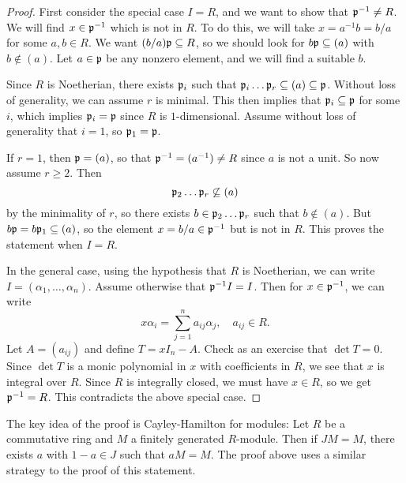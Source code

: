 \begin{proof}
  First consider the special case $I = R$, and we
  want to show that $\mathfrak{p}^{-1} \ne R$. We will find
  $x \in \mathfrak{p}^{-1}$ which is not in $R$. To do this,
  we will take $x = a^{-1} b = b / a$ for some $a, b \in R$.
  We want $(b / a) \mathfrak{p} \subseteq R$, so we should look
  for $b \mathfrak{p} \subseteq (a)$ with $b \notin (a)$.
  Let $a \in \mathfrak{p}$ be any nonzero element, and
  we will find a suitable $b$.

  Since $R$ is Noetherian, there exists $\mathfrak{p}_i$ such that
  $\mathfrak{p}_i \dots \mathfrak{p}_r \subseteq (a) \subseteq \mathfrak{p}$.
  Without loss of generality, we can assume $r$ is minimal.
  This then implies that $\mathfrak{p}_i \subseteq \mathfrak{p}$ for
  some $i$, which implies $\mathfrak{p}_i = \mathfrak{p}$ since
  $R$ is $1$-dimensional. Assume without loss of
  generality that $i = 1$, so $\mathfrak{p}_1 = \mathfrak{p}$.

  If $r = 1$, then $\mathfrak{p} = (a)$, so that
  $\mathfrak{p}^{-1} = (a^{-1}) \ne R$ since $a$ is not a unit.
  So now assume $r \ge 2$. Then
  \[
    \mathfrak{p}_2 \dots \mathfrak{p}_r \not\subseteq (a)
  \]
  by the minimality of $r$, so there exists
  $b \in \mathfrak{p}_2 \dots \mathfrak{p}_r$ such that $b \notin (a)$.
  But $b \mathfrak{p} = b \mathfrak{p}_1 \subseteq (a)$, so the element
  $x = b / a \in \mathfrak{p}^{-1}$
  but is not in $R$. This proves the statement
  when $I = R$.

  In the general case, using the hypothesis that $R$
  is Noetherian, we can write $I = (\alpha_1, \dots, \alpha_n)$.
  Assume otherwise that $\mathfrak{p}^{-1} I = I$.
  Then for $x \in \mathfrak{p}^{-1}$, we can write
  \[
    x \alpha_i = \sum_{j = 1}^n a_{ij} \alpha_j,
    \quad a_{ij} \in R.
  \]
  Let $A = (a_{ij})$ and define
  $T = x I_n - A$. Check as an exercise that
  $\det T = 0$. Since $\det T$ is a monic polynomial
  in $x$ with coefficients in $R$, we see that
  $x$ is integral over $R$. Since $R$ is integrally
  closed, we must have $x \in R$, so we get
  $\mathfrak{p}^{-1} = R$. This contradicts the above special
  case.
\end{proof}

\begin{remark}
  The key idea of the proof is Cayley-Hamilton for
  modules: Let $R$ be a commutative ring and $M$ a
  finitely generated $R$-module. Then if
  $JM = M$, there exists $a$ with $1 - a \in J$
  such that $aM = M$. The proof above uses a similar
  strategy to the proof of this statement.
\end{remark}
